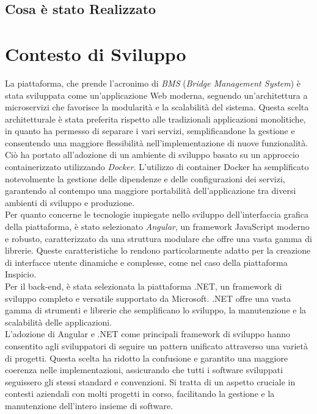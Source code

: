 

\subsection{Cosa è stato Realizzato}

\section{Contesto di Sviluppo}
La piattaforma, che prende l'acronimo di \textit{BMS} (\textit{Bridge Management System}) è stata sviluppata come un'applicazione Web moderna, seguendo un'architettura a microservizi che favorisce la modularità e la scalabilità del sistema. Questa scelta architetturale è stata preferita rispetto alle tradizionali applicazioni monolitiche, in quanto ha permesso di separare i vari servizi, semplificandone la gestione e consentendo una maggiore flessibilità nell'implementazione di nuove funzionalità.
Ciò ha portato all'adozione di un ambiente di sviluppo basato su un approccio containerizzato utilizzando \textit{Docker}. L'utilizzo di container Docker ha semplificato notevolmente la gestione delle dipendenze e delle configurazioni dei servizi, garantendo al contempo una maggiore portabilità dell'applicazione tra diversi ambienti di sviluppo e produzione.
\\Per quanto concerne le tecnologie impiegate nello sviluppo dell'interfaccia grafica della piattaforma, è stato selezionato \textit{Angular}, un framework JavaScript moderno e robusto, caratterizzato da una struttura modulare che offre una vasta gamma di librerie. Queste caratteristiche lo rendono particolarmente adatto per la creazione di interfacce utente dinamiche e complesse, come nel caso della piattaforma Inspicio.
\\Per il back-end, è stata selezionata la piattaforma .NET, un framework di sviluppo completo e versatile supportato da Microsoft. .NET offre una vasta gamma di strumenti e librerie che semplificano lo sviluppo, la manutenzione e la scalabilità delle applicazioni.
\\L'adozione di Angular e .NET come principali framework di sviluppo hanno consentito agli sviluppatori di seguire un pattern unificato attraverso una varietà di progetti. Questa scelta ha ridotto la confusione e garantito una maggiore coerenza nelle implementazioni, assicurando che tutti i software sviluppati seguissero gli stessi standard e convenzioni. Si tratta di un aspetto cruciale in contesti aziendali con molti progetti in corso, facilitando la gestione e la manutenzione dell'intero insieme di software.
